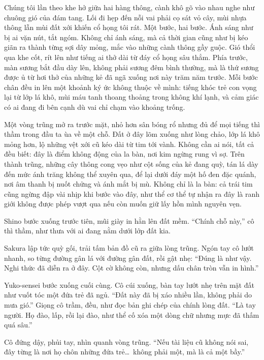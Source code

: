 \documentclass[../main.tex]{subfiles}
\begin{document}
Chúng tôi lần theo khe hở giữa hai hàng thông, cành khô gõ vào nhau nghe như chuông gió của đám tang. Lối đi hẹp đến nỗi vai phải cọ sát vỏ cây, mùi nhựa thông lẫn mùi đất xới khiến cổ họng tôi rát. Một bước, hai bước. Ánh sáng như bị ai vặn nút, tắt ngóm. Không chỉ ánh sáng, mà cả thời gian cũng như bị kéo giãn ra thành từng sợi dây mỏng, mắc vào những cành thông gầy guộc. Gió thổi qua khe cốt, rít lên như tiếng ai thở dài từ đáy cổ họng sâu thẳm. Phía trước, màn sương bắt đầu dày lên, không phải sương đêm bình thường, mà là thứ sương được ủ từ hơi thở của những kẻ đã ngã xuống nơi này trăm năm trước. Mỗi bước chân đều in lên một khoảnh ký ức không thuộc về mình: tiếng khóc trẻ con vọng lại từ lớp lá khô, mùi máu tanh thoang thoảng trong không khí lạnh, và cảm giác có ai đang đi bên cạnh dù vai chỉ chạm vào khoảng trống.

Một vòng trũng mở ra trước mặt, nhỏ hơn sân bóng rổ nhưng đủ để mọi tiếng thì thầm trong đầu ta ùa về một chỗ. Đất ở đây lõm xuống như lòng chảo, lớp lá khô mỏng hơn, lộ những vệt xới cũ kéo dài từ tim tới vành. Không cần ai nói, tất cả đều biết: đây là điểm không động của la bàn, nơi kim ngừng rung vì sợ. Trên thành trũng, những cây thông cong vẹo như cột sống của kẻ đang quỳ, tán lá dày đến mức ánh trăng không thể xuyên qua, để lại dưới đáy một hố đen đặc quánh, nơi âm thanh bị nuốt chửng và ánh mắt bị mù. Không chỉ là la bàn: cả trái tim cũng ngừng đập vài nhịp khi bước vào đây, như thể cơ thể tự nhận ra đây là ranh giới không được phép vượt qua nếu còn muốn giữ lấy hồn mình nguyên vẹn.

Shino bước xuống trước tiên, mũi giày in hằn lên đất mềm. ``Chính chỗ này,'' cô thì thầm, như thưa với ai đang nằm dưới lớp đất kia.

Sakura lập tức quỳ gối, trải tấm bản đồ cũ ra giữa lòng trũng. Ngón tay cô lướt nhanh, so từng đường gân lá với đường gân đất, rồi gật nhẹ: ``Đúng là như vậy. Nghi thức đã diễn ra ở đây. Cột cờ không còn, nhưng dấu chân tròn vẫn in hình.''

Yuko-sensei bước xuống cuối cùng. Cô cúi xuống, bàn tay lướt nhẹ trên mặt đất như vuốt tóc một đứa trẻ đã ngủ. ``Đất này đã bị xáo nhiều lần, không phải do mưa gió.'' Giọng cô trầm, đều, như đọc bản ghi chép của chính lòng đất. ``Là tay người. Họ đào, lấp, rồi lại đào, như thể cố xóa một dòng chữ nhưng mực đã thấm quá sâu.''

Cô đứng dậy, phủi tay, nhìn quanh vòng trũng. ``Nếu tài liệu cũ không nói sai, đây từng là nơi họ chôn những đứa trẻ\dots\ không phải một, mà là cả một bầy.''
\end{document}

